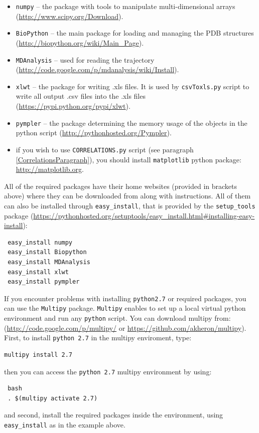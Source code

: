 \documentclass[12pt]{article}
\begin{document}
\begin{itemize}
\item  {\tt numpy} --  the package with tools to manipulate multi-dimensional arrays (\url{http://www.scipy.org/Download}).
\item  {\tt BioPython} -- the main package for loading and managing the PDB structures (\url{http://biopython.org/wiki/Main_Page}).
\item  {\tt MDAnalysis} \cite{Denning2012} -- used for reading the trajectory (\url{http://code.google.com/p/mdanalysis/wiki/Install}).
\item  {\tt xlwt} -- the package for writing .xls files. It is used by {\tt csvToxls.py} script to write all output .csv files into the .xls files (\url{https://pypi.python.org/pypi/xlwt}).
\item  {\tt pympler} -- the package determining the memory usage of the objects in the python script (\url{http://pythonhosted.org/Pympler}). 
\item if you wish to use {\tt CORRELATIONS.py} script (see paragraph \ref{CorrelationsParagraph}), you should install {\tt matplotlib} python package: \url{http://matplotlib.org}. 
\end{itemize}

All of the required packages have their home websites (provided in brackets above) where they can be downloaded from along with instructions. All of them can also be installed through {\tt easy\_install}, that is provided by the {\tt setup\_tools} package (\url{https://pythonhosted.org/setuptools/easy_install.html#installing-easy-install}):

\begin{verbatim}
 easy_install numpy  
 easy_install Biopython
 easy_install MDAnalysis
 easy_install xlwt
 easy_install pympler
\end{verbatim}

If you encounter problems with installing {\tt python2.7} or required packages, you can use the {\tt Multipy} package. {\tt Multipy} enables to set up a local virtual python environment and run any {\tt python} script. You can download multipy from: (\url{http://code.google.com/p/multipy/} or \url{https://github.com/akheron/multipy}). \\

First, to install {\tt python 2.7} in the multipy enviroment, type:
\begin{verbatim}
multipy install 2.7
\end{verbatim}
then you can access the {\tt python 2.7} multipy environment  by using:
\begin{verbatim}
 bash
 . $(multipy activate 2.7)
\end{verbatim}
and second, install the required packages inside the environment, using  {\tt easy\_install} as in the example above.
\end{document}

